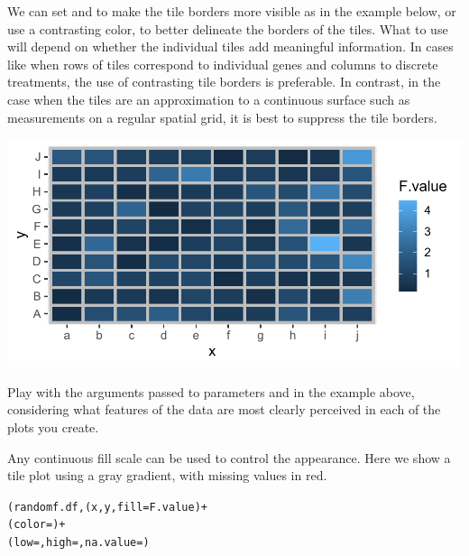 \documentclass[krantz2]{krantz}\usepackage{knitr}
\begin{document}
We can set  and  to make the tile borders more visible as in the example below, or use a contrasting color, to better delineate the borders of the tiles. What to use will depend on whether the individual tiles add meaningful information. In cases like when rows of tiles correspond to individual genes and columns to discrete treatments, the use of contrasting tile borders is preferable. In contrast, in the case when the tiles are an approximation to a continuous surface such as measurements on a regular spatial grid, it is best to suppress the tile borders.

\begin{knitrout}\footnotesize
{}\color{fgcolor}\begin{kframe}
\begin{alltt}
    \hlopt{+}
  \hlstd{(} \hlstd{=} \hlstd{,}  \hlstd{=} \hlstd{)}
\end{alltt}
\end{kframe}

{\centering \includegraphics[width=.7\textwidth]{figure/pos-tile-plot-03-1} 

}


\end{knitrout}

\begin{playground}
Play with the arguments passed to parameters  and  in the example above, considering what features of the data are most clearly perceived in each of the plots you create.
\end{playground}

Any continuous fill scale can be used to control the appearance. Here we show a tile plot using a gray gradient, with missing values in red.

\begin{knitrout}\footnotesize
{}\color{fgcolor}\begin{kframe}
\begin{alltt}
(randomf.df, (x, y, fill = F.value) +
  (color = ) +
  (low = , high = , na.value = )
\end{alltt}
\end{kframe}
\end{knitrout}
\end{document}

